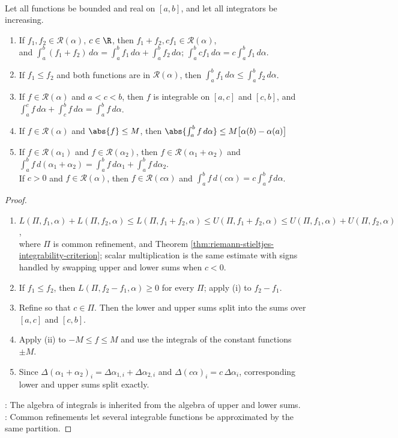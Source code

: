 \begin{theorem} \label{thm:riemann-stieltjes-integral-properties} \\
Let all functions be bounded and real on $[a,b]$, and let all integrators be increasing.
\begin{enumerate}[label=(\roman*)]
\setlength{\itemsep}{0pt}
\item If $f_1,f_2\in\mathcal{R}(\alpha)$, $c\in\R$, then $f_1+f_2,cf_1\in\mathcal{R}(\alpha)$,\\
and $\int_a^b(f_1+f_2)\,d\alpha=\int_a^b f_1\,d\alpha+\int_a^b f_2\,d\alpha$; $\int_a^b cf_1\,d\alpha=c\int_a^b f_1\,d\alpha$.\\
\item If $f_1\leq f_2$ and both functions are in $\mathcal{R}(\alpha)$, then $\int_a^b f_1\,d\alpha\leq\int_a^b f_2\,d\alpha$.
\item If $f\in\mathcal{R}(\alpha)$ and $a<c<b$, then $f$ is integrable on $[a,c]$ and $[c,b]$, and $\int_a^c f\,d\alpha+\int_c^b f\,d\alpha=\int_a^b f\,d\alpha$.
\item If $f\in\mathcal{R}(\alpha)$ and $\abs{f}\leq M$, then $\abs{\int_a^b f\,d\alpha}\leq M\bigl[\alpha(b)-\alpha(a)\bigr]$
\item If $f\in\mathcal{R}(\alpha_1)$ and $f\in\mathcal{R}(\alpha_2)$, then $f\in\mathcal{R}(\alpha_1+\alpha_2)$ and $\int_a^b f\,d(\alpha_1+\alpha_2)=\int_a^b f\,d\alpha_1+\int_a^b f\,d\alpha_2$.\\
If $c>0$ and $f\in\mathcal{R}(\alpha)$, then $f\in\mathcal{R}(c\alpha)$ and $\int_a^b f\,d(c\alpha)=c\int_a^b f\,d\alpha$.
\end{enumerate}
\begin{proof}
\begin{enumerate}[label=(\roman*)]
\setlength{\itemsep}{0pt}
\item $L(\Pi,f_1,\alpha)+L(\Pi,f_2,\alpha)\leq L(\Pi,f_1+f_2,\alpha)\leq U(\Pi,f_1+f_2,\alpha) \leq U(\Pi,f_1,\alpha)+U(\Pi,f_2,\alpha)$,\\
where $\Pi$ is common refinement,  and Theorem \ref{thm:riemann-stieltjes-integrability-criterion}; scalar multiplication is the same estimate with signs handled by swapping upper and lower sums when $c<0$.
\item If $f_1\leq f_2$, then $L(\Pi,f_2-f_1,\alpha)\geq0$ for every $\Pi$; apply (i) to $f_2-f_1$.
\item Refine so that $c\in \Pi$. Then the lower and upper sums split into the sums over $[a,c]$ and $[c,b]$.
\item Apply (ii) to $-M\leq f\leq M$ and use the integrals of the constant functions $\pm M$.
\item Since $\Delta(\alpha_1+\alpha_2)_i=\Delta\alpha_{1,i}+\Delta\alpha_{2,i}$ and $\Delta(c\alpha)_i=c\,\Delta\alpha_i$, corresponding lower and upper sums split exactly.
\end{enumerate}
: The algebra of integrals is inherited from the algebra of upper and lower sums.\\
: Common refinements let several integrable functions be approximated by the same partition.
\end{proof}
\end{theorem}

